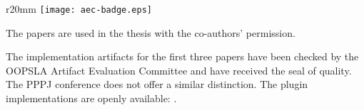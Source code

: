 \begin{wrapfigure}{r}{20mm}
  \vspace{0.7em}
  \centering
  \texttt{[image: aec-badge.eps]}
  \vspace{-4em}
\end{wrapfigure}

The papers are used in the thesis with the co-authors' permission.

The implementation artifacts for the first three papers have been checked by the OOPSLA Artifact Evaluation Committee and have received the seal of quality. The PPPJ conference does not offer a similar distinction.
The plugin implementations are openly available: \cite{miniboxing-www,ildl-plugin,ldl-staging-plugin,ldl-value-class-plugin,miniboxing-plugin}.
